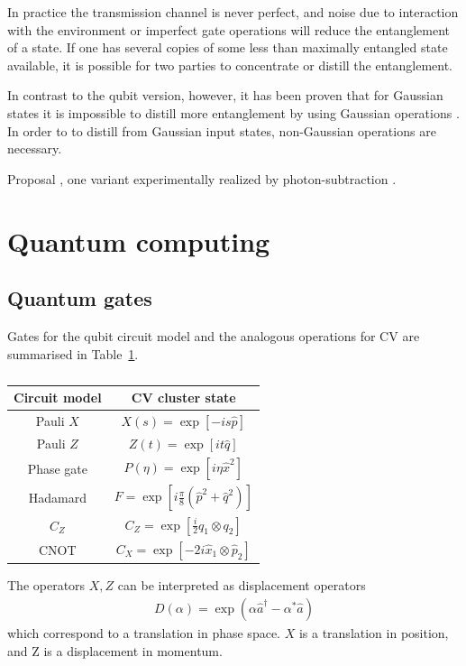 \documentclass[reprint,
superscriptaddress,
 amsmath,amssymb,
 aps,
prb,
]{revtex4-1}
\begin{document}
In practice the transmission channel is never perfect, and noise due to interaction with the environment or imperfect gate operations will reduce the entanglement of a state. If one has several copies of some less than maximally entangled state available, it is possible for two parties to concentrate or distill the entanglement.

In contrast to the qubit version, however, it has been proven that for Gaussian states
it is impossible to distill more entanglement by using Gaussian operations \cite{PhysRevLett.89.137904,PhysRevLett.89.137903,PhysRevA.66.032316}. In order to to distill from Gaussian input states, non-Gaussian operations are necessary.
 
Proposal \cite{eisert2004distillation}, one variant experimentally realized by photon-subtraction \cite{takahashi2010entanglement}.

\section{Quantum computing}



\subsection{Quantum gates}

Gates for the qubit circuit model and the analogous operations for CV are summarised in Table~\ref{tabgates}. \cite{RevModPhys.84.621}
\begin{table}
\begin{tabular}{ |c|c| } 
 \hline
 Circuit model &  CV cluster state \\ 
  \hline\hline
 Pauli $X$ & $X(s) = \exp[-i s \hat p]$  \\ 
 Pauli $Z$ & $Z(t) = \exp[i t \hat q]$  \\ 
 Phase gate & $\hat P (\eta) = \exp[i \eta \hat x^2]$ \\
Hadamard   & $F=\exp[i \frac{\pi}{8}(\hat p^2+\hat q^2)]$ \\
$C_Z$	   & $C_Z= \exp[\frac{i}{2}q_1 \otimes q_2]$ \\
CNOT 	   & $C_X = \exp[-2i\hat x_1 \otimes \hat p_2]$\\
\hline
\end{tabular}
\caption{\label{tabgates}}
\end{table}
%  

The operators $X,Z$ can be interpreted as displacement operators
\begin{align}
D(\alpha) = \exp(\alpha \hat a^\dagger - \alpha^* \hat a)
\end{align}
which correspond to a translation in phase space. $X$ is a translation in position, and Z is a displacement in momentum.
\end{document}
